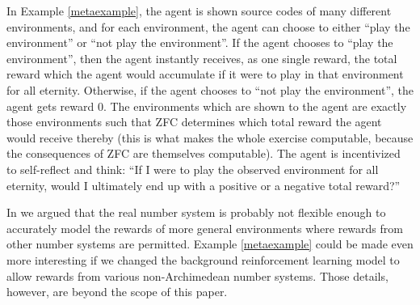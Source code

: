 \documentclass[runningheads]{llncs}
\begin{document}
In Example \ref{metaexample}, the agent is shown source codes of many different
environments, and for each environment, the agent can choose to either ``play the
environment'' or ``not play the environment''. If the agent chooses to ``play the
environment'', then the agent instantly receives, as one single reward,
the total reward which the agent would
accumulate if it were to play in that environment for all eternity. Otherwise, if
the agent chooses to ``not play the environment'', the agent gets reward $0$.
The environments which are shown to the agent are exactly those environments such
that ZFC determines which total reward the agent would receive thereby (this is
what makes the whole exercise computable, because the consequences of ZFC are
themselves computable). The agent is incentivized to self-reflect and think:
``If I were to play the observed environment for all eternity, would I ultimately
end up with a positive or a negative total reward?''

In \cite{alexander2020archimedean} we argued that the real number system is probably not
flexible enough to accurately model the rewards of more general environments where
rewards from other number systems are permitted.
Example \ref{metaexample} could be made even more interesting if we changed the
background reinforcement learning model to allow rewards from various non-Archimedean
number systems. Those details, however, are beyond the scope of this paper.



\end{document}
